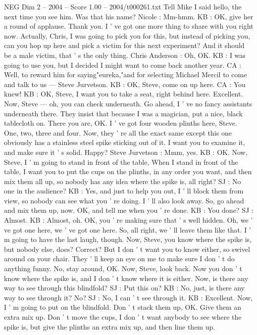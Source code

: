 \begin{textsample}{NEG Dim 2 – 2004 – Score 1.00 – 2004/t000261.txt}
Tell Mike I said hello, the next time you see him.
Was that his name?
Nicole : Mm-hmm.
KB : OK, give her a round of applause.
Thank you.
I ' ve got one more thing to share with you right now.
Actually, Chris, I was going to pick you for this, but instead of picking you, can you hop up here and pick a victim for this next experiment?
And it should be a male victim, that ' s the only thing.
Chris Anderson : Oh, OK.
KB : I was going to use you, but I decided I might want to come back another year.
CA : Well, to reward him for saying"eureka,"and for selecting Michael Mercil to come and talk to us — Steve Jurvetson.
KB : OK, Steve, come on up here.
CA : You knew!
KB : OK, Steve, I want you to take a seat, right behind here.
Excellent.
Now, Steve — oh, you can check underneath.
Go ahead, I ' ve no fancy assistants underneath there.
They insist that because I was a magician, put a nice, black tablecloth on.
There you are, OK.
I ' ve got four wooden plinths here, Steve.
One, two, three and four.
Now, they ' re all the exact same except this one obviously has a stainless steel spike sticking out of it.
I want you to examine it, and make sure it ' s solid.
Happy?
Steve Jurvetson : Mmm, yes.
KB : OK.
Now, Steve, I ' m going to stand in front of the table, When I stand in front of the table, I want you to put the cups on the plinths, in any order you want, and then mix them all up, so nobody has any idea where the spike is, all right?
SJ : No one in the audience?
KB : Yes, and just to help you out, I ' ll block them from view, so nobody can see what you ' re doing.
I ' ll also look away.
So, go ahead and mix them up, now.
OK, and tell me when you ' re done.
KB : You done?
SJ : Almost.
KB : Almost, oh.
OK, you ' re making sure that ' s well hidden.
Oh, we ' ve got one here, we ' ve got one here.
So, all right, we ' ll leave them like that.
I ' m going to have the last laugh, though.
Now, Steve, you know where the spike is, but nobody else, does?
Correct?
But I don ' t want you to know either, so swivel around on your chair.
They ' ll keep an eye on me to make sure I don ' t do anything funny.
No, stay around, OK.
Now, Steve, look back.
Now you don ' t know where the spike is, and I don ' t know where it is either.
Now, is there any way to see through this blindfold?
SJ : Put this on?
KB : No, just, is there any way to see through it?
No?
SJ : No, I can ' t see through it.
KB : Excellent.
Now, I ' m going to put on the blindfold.
Don ' t stack them up, OK.
Give them an extra mix up.
Don ' t move the cups, I don ' t want anybody to see where the spike is, but give the plinths an extra mix up, and then line them up.

\end{textsample}

